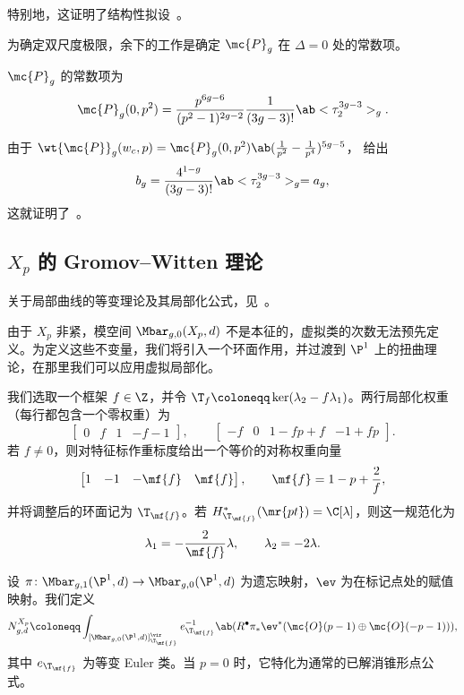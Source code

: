 特别地，这证明了结构性拟设~。

为确定双尺度极限，余下的工作是确定 \(\mc{P}_g\) 在 \(\Delta = 0\) 处的常数项。

\begin{thm}%
\label{thm:local P1 constant term}
    \(\mc{P}_g\) 的常数项为
    \[ \mc{P}_g(0,p^2) = \frac{p^{6g-6}}{(p^2-1)^{2g-2}}\frac{1}{(3g-3)!}\ab<\tau_2^{3g-3}>_g. \]
\end{thm}

由于 \(\wt{\mc{P}}_g(w_c,p) = \mc{P}_g(0,p^2)\ab(\frac{1}{p^2}-\frac{1}{p^4})^{5g-5}\)， 给出
\[ b_g = \frac{4^{1-g}}{(3g-3)!}\ab<\tau_2^{3g-3}>_g = a_g, \]
这就证明了~。

\subsection{\(X_p\) 的 Gromov--Witten 理论}%
\label{sub:Gromov-Witten theory of Xp}

关于局部曲线的等变理论及其局部化公式，见~\cite{BryanPandharipande2008}。

由于 \(X_p\) 非紧，模空间 \(\Mbar_{g,0}(X_p,d)\) 不是本征的，虚拟类的次数无法预先定义。为定义这些不变量，我们将引入一个环面作用，并过渡到 \(\P^1\) 上的扭曲理论，在那里我们可以应用虚拟局部化。

我们选取一个框架 \(f \in \Z\)，并令 \(\T_f \coloneqq \ker(\lambda_2 - f\lambda_1)\)。两行局部化权重（每行都包含一个零权重）为
\[ \begin{bmatrix} 0 & f & 1 & -f-1 \end{bmatrix}, \qquad \begin{bmatrix} -f & 0 & 1-fp+f & -1+fp \end{bmatrix}. \]
若 \(f \neq 0\)，则对特征标作重标度给出一个等价的对称权重向量
\[ \begin{bmatrix} 1 & -1 & -\mf{f} & \mf{f} \end{bmatrix}, \qquad \mf{f} = 1-p+\frac{2}{f}, \]
并将调整后的环面记为 \(\T_{\mf{f}}\)。若 \(H^*_{\T_{\mf{f}}}(\mr{pt}) = \C[\lambda]\)，则这一规范化为
\[ \lambda_1 = -\frac{2}{\mf{f}}\lambda, \qquad \lambda_2 = -2\lambda. \]

设 \(\pi \colon \Mbar_{g,1}(\P^1,d) \to \Mbar_{g,0}(\P^1,d)\) 为遗忘映射，\(\ev\) 为在标记点处的赋值映射。我们定义
\[ N^{X_p}_{g,d} \coloneqq \int_{[\Mbar_{g,0}(\P^1,d)]^{\vir}_{\T_{\mf{f}}}} e_{\T_{\mf{f}}}^{-1}\ab(R^{\bullet}\pi_* \ev^*(\mc{O}(p-1)\oplus\mc{O}(-p-1))), \]
其中 \(e_{\T_{\mf{f}}}\) 为等变 Euler 类。当 \(p=0\) 时，它特化为通常的已解消锥形点公式。

